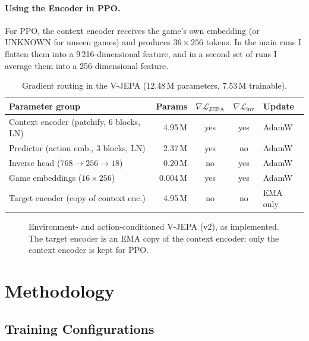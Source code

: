 \documentclass[runningheads]{llncs}
\begin{document}
\paragraph{Using the Encoder in PPO.} For PPO, the context encoder receives the game's own
embedding (or UNKNOWN for unseen games) and produces $36\times256$ tokens. In the main runs I
flatten them into a 9\,216-dimensional feature, and in a second set of runs I average them into
a 256-dimensional feature.

\begin{table}[t]
\centering
\caption{Gradient routing in the V-JEPA (12.48\,M parameters, 7.53\,M trainable).}
\label{tab:grad}
\footnotesize\setlength{\tabcolsep}{4pt}
\begin{tabular}{@{}lrccl@{}}
\toprule
Parameter group & Params & $\nabla\mathcal{L}_{\text{JEPA}}$ & $\nabla\mathcal{L}_{\text{inv}}$ & Update \\
\midrule
Context encoder (patchify, 6 blocks, LN) & 4.95\,M & yes & yes & AdamW \\
Predictor (action emb., 3 blocks, LN) & 2.37\,M & yes & no & AdamW \\
Inverse head ($768\to256\to18$) & 0.20\,M & no & yes & AdamW \\
Game embeddings ($16\times256$) & 0.004\,M & yes & yes & AdamW \\
Target encoder (copy of context enc.) & 4.95\,M & no & no & EMA only \\
\bottomrule
\end{tabular}
\end{table}

\begin{figure}[t]
\centering

\caption{Environment- and action-conditioned V-JEPA (v2), as implemented. The target
encoder is an EMA copy of the context encoder; only the context encoder is kept for PPO.}
\label{fig:jepa}
\end{figure}

\section{Methodology}
\label{sec:method}

\subsection{Training Configurations}
\end{document}
